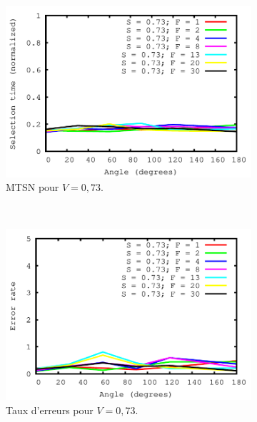 	\begin{figure}[!htb]
		\centering
		\begin{subfigure}[t]{\subImgWlineplot}
			\centering
			\includegraphics[width=\textwidth]{figures/ch4/angle_speed_0_73_times}
			\caption{MTSN pour $V = 0,73$.}
			\label{fig:aEffect_t_073}
		\end{subfigure}
		~
		\begin{subfigure}[t]{\subImgWlineplot}
			\centering
			\includegraphics[width=\textwidth]{figures/ch4/angle_speed_0_73_errors}
			\caption{Taux d'erreurs pour $V = 0,73$.}
			\label{fig:aEffect_e_073}
		\end{subfigure}
		~
		\begin{subfigure}[t]{\subImgWlineplot}
			\centering

\end{subfigure}
\end{figure}
